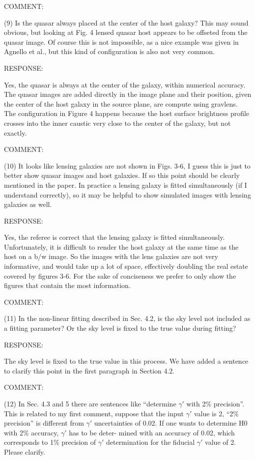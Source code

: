 \documentclass[a4paper,11pt]{article}
\begin{document}
COMMENT:

(9) Is the quasar always placed at the center of the host galaxy? This
may sound obvious, but looking at Fig. 4 lensed quasar host appears to
be offseted from the quasar image. Of course this is not impossible,
as a nice example was given in Agnello et al., but this kind of
configuration is also not very common.

RESPONSE:

Yes, the quasar is always at the center of the galaxy, within
numerical accuracy. The quasar images are added directly in the image
plane and their position, given the center of the host galaxy in the
source plane, are compute using gravlens. The configuration in Figure
4 happens because the host surface brightness profile crosses into the
inner caustic very close to the center of the galaxy, but not exactly.


COMMENT:

(10) It looks like lensing galaxies are not shown in Figs. 3-6, 
I guess this is just to better show quasar images and host galaxies. 
If so this point should be clearly mentioned in the paper. 
In practice a lensing galaxy is fitted simultaneously (if I understand correctly), 
so it may be helpful to show simulated images with lensing galaxies as well.

RESPONSE:

Yes, the referee is correct that the lensing galaxy is fitted
simultaneously. Unfortunately, it is difficult to render the host
galaxy at the same time as the host on a b/w image. So the images with
the lens galaxies are not very informative, and would take up a lot of
space, effectively doubling the real estate covered by figures
3-6. For the sake of conciseness we prefer to only show the figures
that contain the most information.


COMMENT:

(11) In the non-linear fitting described in Sec. 4.2, is the sky level
not included as a fitting parameter? Or the sky level is fixed to the
true value during fitting?


RESPONSE:

The sky level is fixed to the true value in this process. We have
added a sentence to clarify this point in the first paragraph in
Section 4.2.


COMMENT:

(12) In Sec. 4.3 and 5 there are sentences like ``determine $\gamma'$
with 2\% precision''. This is related to my first comment, suppose
that the input $\gamma'$ value is 2, ``2\% precision'' is different
from $\gamma'$ uncertainties of 0.02. If one wants to determine H0
with 2\% accuracy, $\gamma'$ has to be deter- mined with an accuracy
of 0.02, which corresponds to 1\% precision of $\gamma'$ determination
for the fiducial $\gamma'$ value of 2. Please clarify.
\end{document}
